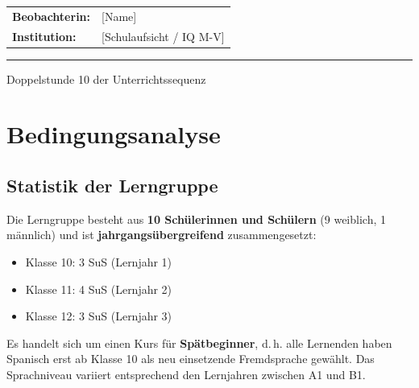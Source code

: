 \documentclass[11pt, a4paper]{article}
\begin{document}
\begin{center}
    \vspace{1.5cm}

    \begin{tabular}{ll}
        \textbf{Beobachterin:} & [Name] \\[6pt]
        \textbf{Institution:} & [Schulaufsicht / IQ M-V] \\[6pt]
    \end{tabular}

    \vfill

    \hrule
    \vspace{0.3cm}
    {\small\color{grau} Doppelstunde 10 der Unterrichtssequenz}

\end{center}

\newpage


\tableofcontents
\newpage


\section{Bedingungsanalyse}

\subsection{Statistik der Lerngruppe}

Die Lerngruppe besteht aus \textbf{10 Schülerinnen und Schülern} (9 weiblich, 1 männlich) und ist \textbf{jahrgangsübergreifend} zusammengesetzt:
\begin{itemize}[leftmargin=2em]
    \item Klasse 10: 3 SuS (Lernjahr 1)
    \item Klasse 11: 4 SuS (Lernjahr 2)
    \item Klasse 12: 3 SuS (Lernjahr 3)
\end{itemize}

Es handelt sich um einen Kurs für \textbf{Spätbeginner}, d.\,h. alle Lernenden haben Spanisch erst ab Klasse 10 als neu einsetzende Fremdsprache gewählt. Das Sprachniveau variiert entsprechend den Lernjahren zwischen A1 und B1.
\end{document}
